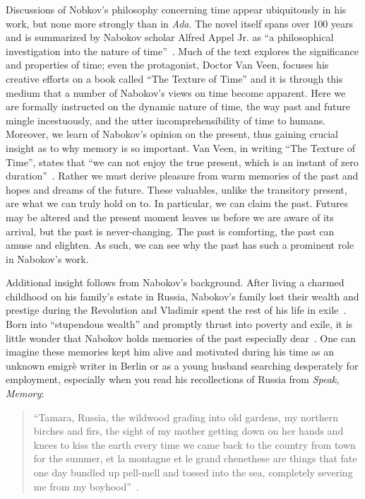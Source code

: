 Discussions of Nobkov's philosophy concerning time appear ubiquitously in his work, but none more strongly than in \emph{Ada}.
The novel itself spans over 100 years and is summarized by Nabokov scholar Alfred Appel Jr. as ``a philosophical investigation into the nature of time''~\cite{appelada}.
Much of the text explores the significance and properties of time; even the protagonist, Doctor Van Veen, focuses his creative efforts on a book called ``The Texture of Time'' and it is through this medium that a number of Nabokov's views on time become apparent.
Here we are formally instructed on the dynamic nature of time, the way past and future mingle incestuously, and the utter incomprehensibility of time to humans.
Moreover, we learn of Nabokov's opinion on the present, thus gaining crucial insight as to why memory is so important.
Van Veen, in writing ``The Texture of Time'', states that ``we can not enjoy the true present, which is an instant of zero duration''~\cite{appelada}.
Rather we must derive pleasure from warm memories of the past and hopes and dreams of the future. 
These valuables, unlike the transitory present, are what we can truly hold on to.
In particular, we can claim the past.
Futures may be altered and the present moment leaves us before we are aware of its arrival, but the past is never-changing. 
The past is comforting, the past can amuse and elighten. 
As such, we can see why the past has such a prominent role in Nabokov's work.

Additional insight follows from Nabokov's background. 
After living a charmed childhood on his family's estate in Russia, Nabokov's family lost their wealth and prestige during the Revolution and Vladimir spent the rest of his life in exile~\cite{boyd1993vladimir}.
Born into ``stupendous wealth'' and promptly thrust into poverty and exile, it is little wonder that Nabokov holds memories of the past especially dear~\cite[Boyd, 3]{boyd1993vladimir}.
One can imagine these memories kept him alive and motivated during his time as an unknown emigr\`e writer in Berlin or as a young husband searching desperately for employment, especially when you read his recollections of Russia from \emph{Speak, Memory}:
\begin{quotation}
``Tamara, Russia, the wildwood grading into old gardens, my northern birches and firs, the sight of my mother getting down on her hands and knees to kiss the earth every time we came back to the country from town for the summer, et la montagne et le grand chene\textemdash these are things that fate one day bundled up pell-mell and tossed into the sea, completely severing me from my boyhood''~\cite[249-250]{speakmemory}.
\end{quotation}


